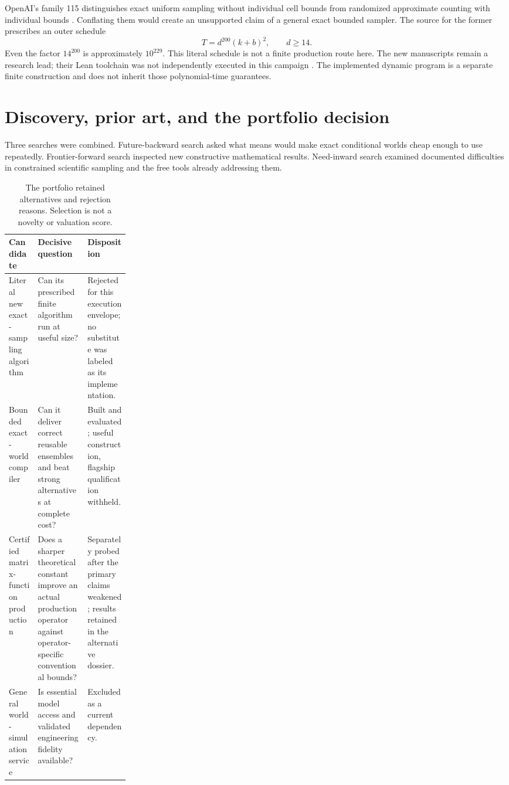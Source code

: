 \documentclass[11pt,letterpaper]{article}
\begin{document}
OpenAI's family 115 distinguishes exact uniform sampling without individual cell bounds
from randomized approximate counting with individual bounds \cite{openaiScope}.
Conflating them would create an unsupported claim of a general exact bounded sampler.
The source for the former prescribes an outer schedule
\[
T=d^{200}(k+b)^2,\qquad d\ge14.
\]
Even the factor $14^{200}$ is approximately $10^{229}$. This literal schedule is not a
finite production route here. The new manuscripts remain a research lead; their Lean
toolchain was not independently executed in this campaign \cite{openaiAlgorithm,openaiScience}.
The implemented dynamic program is a separate finite construction and does not inherit
those polynomial-time guarantees.

\section{Discovery, prior art, and the portfolio decision}

Three searches were combined. Future-backward search asked what means would make exact
conditional worlds cheap enough to use repeatedly. Frontier-forward search inspected
new constructive mathematical results. Need-inward search examined documented difficulties
in constrained scientific sampling and the free tools already addressing them.

\begin{table}[htbp]
\small
\begin{tabularx}{\linewidth}{@{}P{0.24\linewidth}YY@{}}
\toprule
Candidate & Decisive question & Disposition \\
\midrule
Literal new exact-sampling algorithm & Can its prescribed finite algorithm run at useful size? & Rejected for this execution envelope; no substitute was labeled as its implementation.\\
Bounded exact-world compiler & Can it deliver correct reusable ensembles and beat strong alternatives at complete cost? & Built and evaluated; useful construction, flagship qualification withheld.\\
Certified matrix-function production & Does a sharper theoretical constant improve an actual production operator against operator-specific conventional bounds? & Separately probed after the primary claims weakened; results retained in the alternative dossier.\\
General world-simulation service & Is essential model access and validated engineering fidelity available? & Excluded as a current dependency.\\
\bottomrule
\end{tabularx}
\caption{The portfolio retained alternatives and rejection reasons. Selection is not a novelty or valuation score.}
\end{table}
\end{document}
